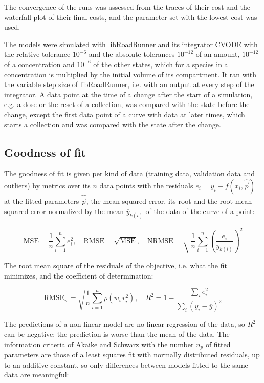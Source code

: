 The convergence of the runs was assessed from the traces of their cost and the waterfall plot of their final costs, and the parameter set with the lowest cost was used.

The models were simulated with libRoadRunner \cite{Welsh2023} and its integrator CVODE \cite{Hindmarsh2005} with the relative tolerance $10^{-6}$ and the absolute tolerances $10^{-12}$ of an amount, $10^{-12}$ of a concentration and $10^{-6}$ of the other states, which for a species in a concentration is multiplied by the initial volume of its compartment. It ran with the variable step size of libRoadRunner, i.e. with an output at every step of the integrator. A data point at the time of a change after the start of a simulation, e.g. a dose or the reset of a collection, was compared with the state before the change, except the first data point of a curve with data at later times, which starts a collection and was compared with the state after the change.

\subsection{Goodness of fit}

The goodness of fit is given per kind of data (training data, validation data and outliers) by metrics over its $n$ data points with the residuals $e_i = y_i - f(x_i, \hat{\vec{p}})$ at the fitted parameters $\hat{\vec{p}}$, the mean squared error, its root and the root mean squared error normalized by the mean $\overline{y}_{k(i)}$ of the data of the curve of a point:

\begin{equation}
\mathrm{MSE} = \frac{1}{n} \sum_{i=1}^{n} e_i^2, \quad \mathrm{RMSE} = \sqrt{\mathrm{MSE}}, \quad \mathrm{NRMSE} = \sqrt{\frac{1}{n} \sum_{i=1}^{n} \left(\frac{e_i}{\overline{y}_{k(i)}}\right)^2}
\end{equation}

The root mean square of the residuals of the objective, i.e. what the fit minimizes, and the coefficient of determination:

\begin{equation}
\mathrm{RMSE}_w = \sqrt{\frac{1}{n} \sum_{i=1}^{n} \rho\left(w_i\, r_i^2\right)}, \quad R^2 = 1 - \frac{\sum_{i} e_i^2}{\sum_{i} \left(y_i - \overline{y}\right)^2}
\end{equation}

The predictions of a non-linear model are no linear regression of the data, so $R^2$ can be negative: the prediction is worse than the mean of the data. The information criteria of Akaike \cite{Akaike1974} and Schwarz \cite{Schwarz1978} with the number $n_p$ of fitted parameters are those of a least squares fit with normally distributed residuals, up to an additive constant, so only differences between models fitted to the same data are meaningful:

